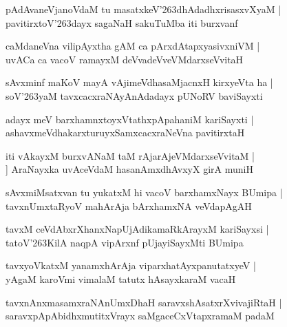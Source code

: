 \documentclass[twoside,12pt,openright]{book}
\def\S{\char'263}
\newcounter{shloka}[chapter]
\begin{document}
\begin{shloka}%
pAdAvaneVjanoVdaM tu masatxkeV\S dhAdadhxrisasxvXyaM |\\
pavitirxtoV\S dayx sagaNaH sakuTuMba iti burxvanf 
\end{shloka}

\begin{shloka}%
caMdaneVna vilipAyxtha gAM ca pArxdAtapxyasivxniVM |\\
uvACa ca vacoV ramayxM deVvadeVveVMdarxseVvitaH 
\end{shloka}

\begin{shloka}%
sAvxminf maKoV mayA vAjimeVdhasaMjacnxH kirxyeVta ha |\\
soV\S yaM tavxcacxraNAyAnAdadayx pUNoRV baviSayxti
\end{shloka}

\begin{shloka}%
adayx meV barxhamnxtoyxVtathxpApahaniM kariSayxti |\\
ashavxmeVdhakarxturuyxSamxcacxraNeVna pavitirxtaH 
\end{shloka}

\begin{shloka}%
iti vAkayxM burxvANaM taM rAjarAjeVMdarxseVvitaM |\\]
AraNayxka uvAceVdaM hasanAmxdhAvxyX girA muniH 
\end{shloka}

\begin{shloka}%
sAvxmiMsatxvan tu yukatxM hi vacoV barxhamxNayx BUmipa |\\
tavxnUmxtaRyoV mahArAja bArxhamxNA veVdapAgAH 
\end{shloka}

\begin{shloka}%
tavxM ceVdAbxrXhanxNapUjAdikamaRkArayxM kariSayxsi |\\
tatoV\S KilA naqpA vipArxnf pUjayiSayxMti BUmipa 
\end{shloka}

\begin{shloka}%
tavxyoVkatxM yanamxhArAja viparxhatAyxpanutatxyeV |\\
yAgaM karoVmi vimalaM tatutx hAsayxkaraM vacaH 
\end{shloka}

\begin{shloka}%
tavxnAnxmasamxraNAnUmxDhaH saravxshAsatxrXvivajiRtaH |\\
saravxpApAbidhxmutitxVrayx saMgaceCxVtapxramaM padaM 
\end{shloka}
\end{document}
